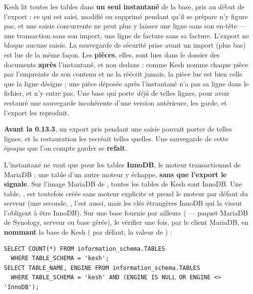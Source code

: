 \documentclass[a4paper,11pt,oneside]{article}
\begin{document}
Kesh lit toutes les tables dans \textbf{un seul instantané} de la base, pris au début de l'export : ce qui est saisi, modifié ou supprimé pendant qu'il se prépare n'y figure pas, et une saisie concurrente ne peut plus y laisser une ligne sans son en-tête --- une transaction sans son import, une ligne de facture sans sa facture. L'export ne bloque aucune saisie. La sauvegarde de sécurité prise avant un import (plus bas) est lue de la même façon. Les \textbf{pièces}, elles, sont lues dans le dossier des documents \textbf{après} l'instantané, et non dedans : comme Kesh nomme chaque pièce par l'empreinte de son contenu et ne la réécrit jamais, la pièce lue est bien celle que la ligne désigne ; une pièce déposée après l'instantané n'a pas sa ligne dans le fichier, et n'y entre pas. Une base qui porte \emph{déjà} de telles lignes, pour avoir restauré une sauvegarde incohérente d'une version antérieure, les garde, et l'export les reproduit.

\begin{keshwarning}
\textbf{Avant la 0.13.3}, un export pris pendant une saisie pouvait porter de telles lignes, et la restauration les recréait telles quelles. Une sauvegarde de cette époque que l'on compte garder se \textbf{refait}.
\end{keshwarning}

L'instantané ne vaut que pour les tables \textbf{InnoDB}, le moteur transactionnel de MariaDB ; une table d'un autre moteur y échappe, \textbf{sans que l'export le signale}. Sur l'image MariaDB de , toutes les tables de Kesh sont InnoDB. Une table, , est toutefois créée sans moteur explicite et prend le moteur par défaut du serveur (une seconde, , l'est aussi, mais les clés étrangères InnoDB qui la visent l'obligent à être InnoDB). Sur une base fournie par ailleurs ( --- paquet MariaDB de Synology, serveur ou base gérée), le vérifier une fois, par le client MariaDB, en \textbf{nommant} la base de Kesh ( par défaut, la valeur de ) :

\begin{lstlisting}
SELECT COUNT(*) FROM information_schema.TABLES
  WHERE TABLE_SCHEMA = 'kesh';
SELECT TABLE_NAME, ENGINE FROM information_schema.TABLES
  WHERE TABLE_SCHEMA = 'kesh' AND (ENGINE IS NULL OR ENGINE <> 'InnoDB');
\end{lstlisting}
\end{document}
